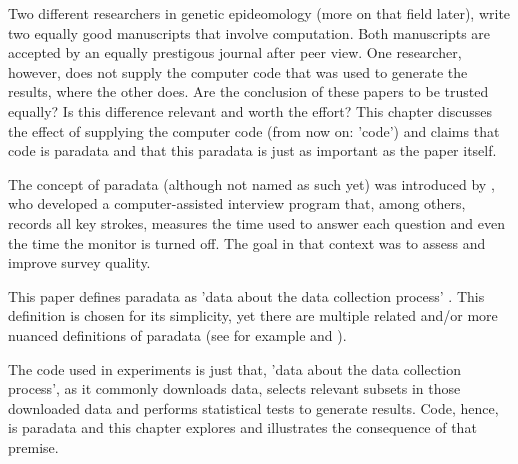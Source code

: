 

Two different researchers in genetic epideomology (more on that field later), 
write two equally good manuscripts
that involve computation.
Both manuscripts are accepted by an equally prestigous journal after peer view. 
One researcher, however, does not supply the
computer code that was used to generate the results,
where the other does.
Are the conclusion of these papers to be trusted equally?
Is this difference relevant and worth the effort?
This chapter discusses the effect of supplying the computer 
code (from now on: 'code') 
and claims that code is paradata and that this paradata 
is just as important as the paper itself.


The concept of paradata (although not named as such yet) 
was introduced by \cite{couper1998measuring},
who developed a computer-assisted interview program
that, among others, records all key strokes,
measures the time used to answer each question 
and even the time the monitor is turned off.
The goal in that context was to assess and improve survey quality.


This paper defines paradata as 'data about the data collection 
process' \cite{choumert2019using}.
This definition is chosen for its simplicity, 
yet there are multiple related and/or more nuanced 
definitions of paradata (see for example \cite{huvila2022improving} 
and \cite{skold2022interrogating}).


The code used in experiments is just that, 'data about the data collection 
process', as it commonly downloads data, selects relevant subsets in those
downloaded data and performs statistical tests to generate results.
Code, hence, is paradata and this chapter explores and illustrates the
consequence of that premise.

